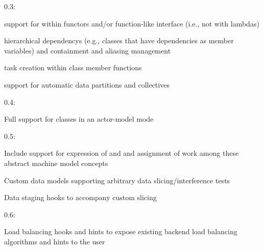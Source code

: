 \begin{compactdesc}
\item[0.3:]
\begin{compactitem}
\item support for  within functors and/or
function-like interface (i.e., not with lambdas)
\item hierarchical \glspl{dependency} (e.g., classes that have dependencies as
member variables) and containment and aliasing management
\item task creation within class member functions
\item support for automatic data partitions and collectives
\end{compactitem}
\item[0.4:]
\begin{compactitem}
\item Full support for classes in an actor-model mode 
\end{compactitem}
\item[0.5:]
\begin{compactitem}
\item Include support for expression of  and
 and assignment of work among these abstract machine
model concepts
\item Custom data models supporting arbitrary data slicing/interference tests
\item Data staging hooks to accompany custom slicing
\end{compactitem}
\item[0.6:]
\begin{compactitem}
\item Load balancing hooks and hints to expose existing backend load balancing algorithms and hints to the user
\end{compactitem}
\end{compactdesc}
